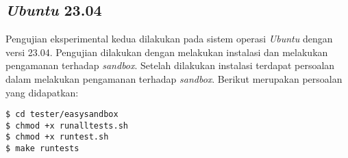 \subsection{\textit{Ubuntu} 23.04}
Pengujian eksperimental kedua dilakukan pada sistem operasi \textit{Ubuntu} dengan versi 23.04. Pengujian dilakukan dengan melakukan instalasi dan melakukan pengamanan terhadap \textit{sandbox}. Setelah dilakukan instalasi terdapat persoalan dalam melakukan pengamanan terhadap \textit{sandbox}. Berikut merupakan persoalan yang didapatkan:
\begin{lstlisting}[caption=Pembangunan \textit{sandbox} pada \textit{Ubuntu} 23.04, label=kode:sandbox2304]
$ cd tester/easysandbox
$ chmod +x runalltests.sh
$ chmod +x runtest.sh
$ make runtests
\end{lstlisting}

